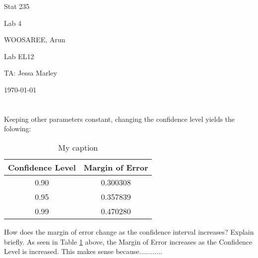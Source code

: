\documentclass[letterpaper]{article}
\begin{document}
\begin{titlepage}
 \begin{center}
  \vspace*{1cm}
  \Huge
  Stat 235
  \vspace{1cm}
  
  Lab 4
  \vspace{1cm}
  
  WOOSAREE, Arun
  \vspace{1cm}
  
  \Huge
  Lab EL12
  \vspace{1cm}
  
  TA: Jessa Marley
  \vspace{1cm}
  
  \today
  \vfill
 \end{center}
\end{titlepage}

\section{}%

\subsection{}%
Keeping other parameters constant, changing the confidence level yields the folowing:
\begin{table}[H]
 \centering
 \begin{tabular}{|c|c|}
  \hline
  Confidence Level & Margin of Error \\ \hline
  0.90             & 0.300308        \\ \hline
  0.95             & 0.357839        \\ \hline
  0.99             & 0.470280        \\ \hline
 \end{tabular}
 \caption{My caption}
 \label{1a}
\end{table}
How does the margin of
error change as the confidence interval increases? Explain briefly.
As seen in Table \ref{1a} above, the Margin of Error increases as the
Confidence Level is increased. This makes sense because............


\subsection{}%
\end{document}
